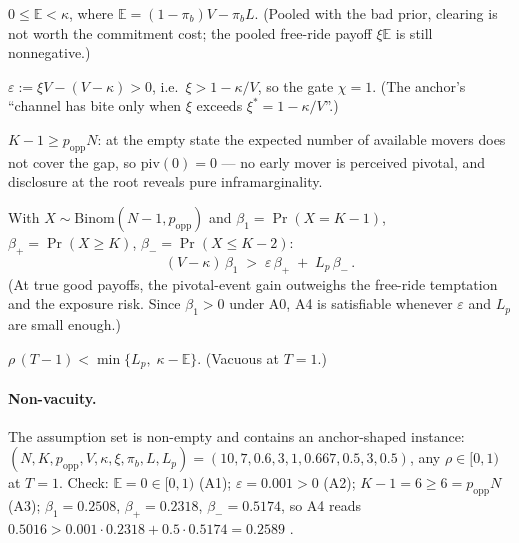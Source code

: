 \begin{assumption}\label{ass:A1}
$0\le \mathbb E<\kappa$, where $\mathbb E=(1-\pi_b)V-\pi_b L$. (Pooled with the bad prior,
clearing is not worth the commitment cost; the pooled free-ride payoff $\xi\mathbb E$ is still
nonnegative.)
\end{assumption}

\begin{assumption}\label{ass:A2}
$\varepsilon:=\xi V-(V-\kappa)>0$, i.e.\ $\xi>1-\kappa/V$, so the gate $\chi=1$. (The anchor's
``channel has bite only when $\xi$ exceeds $\xi^*=1-\kappa/V$''.)
\end{assumption}

\begin{assumption}\label{ass:A3}
$K-1\ge p_{\mathrm{opp}}N$: at the empty state the expected number of available movers does not
cover the gap, so $\mathrm{piv}(0)=0$ --- no early mover is perceived pivotal, and disclosure at
the root reveals pure inframarginality.
\end{assumption}

\begin{assumption}\label{ass:A4}
With $X\sim\mathrm{Binom}(N-1,p_{\mathrm{opp}})$ and $\beta_1=\Pr(X=K-1)$,
$\beta_+=\Pr(X\ge K)$, $\beta_-=\Pr(X\le K-2)$:
\[
(V-\kappa)\,\beta_1\;>\;\varepsilon\,\beta_+\;+\;L_p\,\beta_-\,.
\]
(At true good payoffs, the pivotal-event gain outweighs the free-ride temptation and the
exposure risk. Since $\beta_1>0$ under A0, A4 is satisfiable whenever $\varepsilon$ and $L_p$
are small enough.)
\end{assumption}

\begin{assumption}\label{ass:A5}
$\rho\,(T-1)<\min\{L_p,\;\kappa-\mathbb E\}$. (Vacuous at $T=1$.)
\end{assumption}

\paragraph{Non-vacuity.}
The assumption set is non-empty and contains an anchor-shaped instance:
$(N,K,p_{\mathrm{opp}},V,\kappa,\xi,\pi_b,L,L_p)=(10,7,0.6,3,1,0.667,0.5,3,0.5)$, any
$\rho\in[0,1)$ at $T=1$. Check: $\mathbb E=0\in[0,1)$ (A1); $\varepsilon=0.001>0$ (A2);
$K-1=6\ge 6=p_{\mathrm{opp}}N$ (A3); $\beta_1=0.2508$, $\beta_+=0.2318$, $\beta_-=0.5174$, so
A4 reads $0.5016>0.001\cdot 0.2318+0.5\cdot 0.5174=0.2589$ \checkmark.


